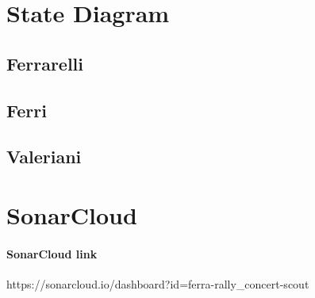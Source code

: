 \documentclass[11pt,a4paper]{article}
\begin{document}
\section{State Diagram}
\subsection{Ferrarelli}
\subsection{Ferri}
\subsection{Valeriani}
\section{SonarCloud}
\paragraph{SonarCloud link} https://sonarcloud.io/dashboard?id=ferra-rally\_concert-scout
\end{document}
